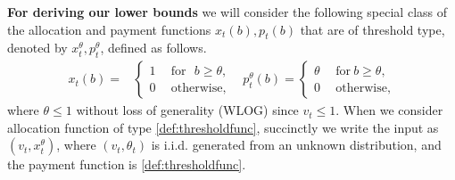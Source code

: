 {\bf For deriving our lower bounds} we will consider the following special class of the allocation and payment functions $x_t(b),p_t(b)$ that are of threshold type, denoted by $x_t^\theta, p_t^\theta$, defined as follows.
\begin{align} \label{def:thresholdfunc}
x_t(b) =
&\left\{
\begin{aligned}
1 & \ \ \text{for}\ \ \ b \ge \theta,\\
0 &\ \  \text{otherwise,}
\end{aligned}\right.
& 
p_t^\theta(b) = 
\left\{\begin{aligned}
 \theta &\ \  \text{for}\ b \ge \theta,\\
 0 &\ \  \text{otherwise,}
\end{aligned}\right. 
\end{align}
where $\theta\le 1$ without loss of generality (WLOG) since $v_t\le 1$.
When we consider allocation function of type \eqref{def:thresholdfunc}, succinctly we write the input as $(v_t, x_t^\theta)$, where $(v_t, \theta_t)$ is i.i.d. generated from an unknown distribution, and the payment function is \eqref{def:thresholdfunc}.

